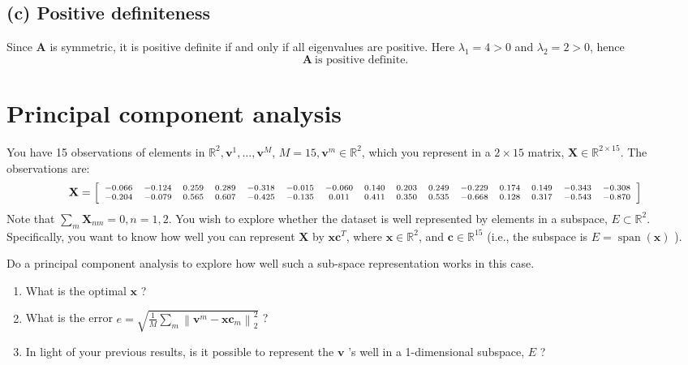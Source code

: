 \documentclass{article}
\begin{document}
\subsection*{(c) Positive definiteness}

Since $\mathbf{A}$ is symmetric, it is positive definite if and only if all eigenvalues are positive.
Here $\lambda_1=4>0$ and $\lambda_2=2>0$, hence
\[
\boxed{\mathbf{A}\ \text{is positive definite.}}
\]



\newpage

\section{Principal component analysis}
You have 15 observations of elements in $\mathbb{R}^{2}, \mathbf{v}^{1}, \ldots, \mathbf{v}^{M}$, $M=15, \mathbf{v}^{m} \in \mathbb{R}^{2}$, which you represent in a $2 \times 15$ matrix, $\mathbf{X} \in \mathbb{R}^{2 \times 15}$. The observations are:
\[
\mathbf{X}=\scriptsize \left[\begin{array}{ccccccccccccccc}
 -0.066 & -0.124 & 0.259 & 0.289 & -0.318 & -0.015 & -0.060 & 0.140 & 0.203 & 0.249 & -0.229 & 0.174 & 0.149 & -0.343 & -0.308 \\
-0.204 & -0.079 & 0.565 & 0.607 & -0.425 & -0.135 & 0.011 & 0.411 & 0.350 & 0.535 & -0.668 & 0.128 & 0.317 & -0.543 & -0.870
\end{array}\right]
\]
Note that $\sum_{m} \mathbf{X}_{n m}=0, n=1,2$. You wish to explore whether the dataset is well represented by elements in a subspace, $E \subset \mathbb{R}^{2}$. Specifically, you want to know how well you can represent $\mathbf{X}$ by $\mathbf{x c}^{T}$, where $\mathbf{x} \in \mathbb{R}^{2}$, and $\mathbf{c} \in \mathbb{R}^{15}$ (i.e., the subspace is $E=\operatorname{span}(\mathbf{x})$ ).

Do a principal component analysis to explore how well such a sub-space representation works in this case.

\begin{enumerate}
\item[(a)] What is the optimal $\mathbf{x}$ ?
\item[(b)] What is the error $e=\sqrt{\frac{1}{M} \sum_{m}\left\|\mathbf{v}^{m}-\mathbf{x c}_{m}\right\|_{2}^{2}}$ ?
\item[(c)] In light of your previous results, is it possible to represent the $\mathbf{v}$ 's well in a 1-dimensional subspace, $E$ ?
\end{enumerate}
\end{document}
